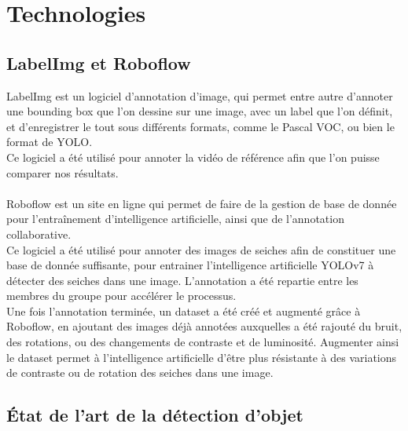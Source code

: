 \chapter{Technologies}

\section{LabelImg et Roboflow}
LabelImg est un logiciel d'annotation d'image, qui permet entre autre d'annoter une bounding box que l'on dessine sur une image, avec un label que l'on définit, et d'enregistrer le tout sous différents formats, comme le Pascal VOC, ou bien le format de YOLO.\\
Ce logiciel a été utilisé pour annoter la vidéo de référence afin que l'on puisse comparer nos résultats.\\
\\
Roboflow est un site en ligne qui permet de faire de la gestion de base de donnée pour l'entraînement d'intelligence artificielle, ainsi que de l'annotation collaborative.\\
Ce logiciel a été utilisé pour annoter des images de seiches afin de constituer une base de donnée suffisante, pour entrainer l'intelligence artificielle YOLOv7\cite{wang_yolov7_nodate} à détecter des seiches dans une image. L'annotation a été repartie entre les membres du groupe pour accélérer le processus.\\
Une fois l'annotation terminée, un dataset a été créé et augmenté grâce à Roboflow, en ajoutant des images déjà annotées auxquelles a été rajouté du bruit, des rotations, ou des changements de contraste et de luminosité. Augmenter ainsi le dataset permet à l'intelligence artificielle d'être plus résistante à des variations de contraste ou de rotation des seiches dans une image.\\




\section{État de l'art de la détection d'objet}

